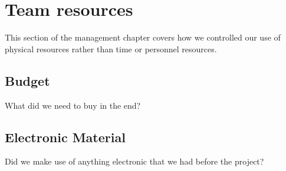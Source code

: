 \section{Team resources}
\label{team_resources}

This section of the management chapter covers how we controlled our use of physical resources rather than time or personnel resources.

\subsection{Budget}

What did we need to buy in the end?

\subsection{Electronic Material}

Did we make use of anything electronic that we had before the project?
